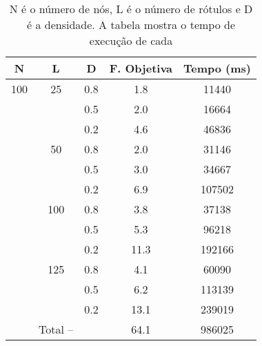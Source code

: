 \documentclass{sig-alternate-05-2015}
\begin{document}
\begin{table}[!h]


\begin{tabular}{ccccc}
	\hline \rule[-2ex]{0pt}{5.5ex} N & L & D & F. Objetiva & Tempo (ms) \\ 
	 \hline\rule[-2ex]{0pt}{5.5ex} 100 & 25 & 0.8 & 1.8 & 11440 \\ 
	 \rule[-2ex]{0pt}{5.5ex}  &  & 0.5 & 2.0 & 16664 \\ 
	 \rule[-2ex]{0pt}{5.5ex}  &  & 0.2 & 4.6 & 46836 \\ 
	 \rule[-2ex]{0pt}{5.5ex}  & 50 & 0.8 & 2.0 & 31146 \\ 
	 \rule[-2ex]{0pt}{5.5ex}  &  & 0.5 & 3.0 & 34667 \\ 
	 \rule[-2ex]{0pt}{5.5ex}  &  & 0.2 & 6.9 & 107502 \\ 
	 \rule[-2ex]{0pt}{5.5ex}  & 100 & 0.8 & 3.8 & 37138 \\ 
	 \rule[-2ex]{0pt}{5.5ex}  &  & 0.5 & 5.3 & 96218 \\ 
	 \rule[-2ex]{0pt}{5.5ex}  &  & 0.2 & 11.3 & 192166 \\ 
	 \rule[-2ex]{0pt}{5.5ex}  & 125 & 0.8 & 4.1 & 60090 \\ 
	 \rule[-2ex]{0pt}{5.5ex}  &  & 0.5 & 6.2 & 113139 \\ 
	 \rule[-2ex]{0pt}{5.5ex}  &  & 0.2 & 13.1 & 239019 \\ 
	 \hline\rule[-2ex]{0pt}{5.5ex}  & Total -- &  & 64.1 & 986025 \\ 
	\hline 
\end{tabular} 
\caption{N é o número de nós, L é o número de rótulos e D é a densidade.  A tabela mostra o tempo de execução de cada}
\label{tab2}
\end{table}
\end{document}
